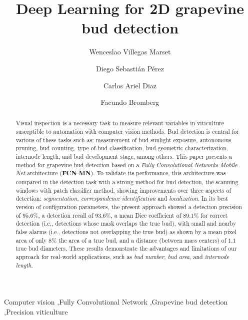 \documentclass[a4paper,authoryear,review]{elsarticle}
\begin{document}
	
	\begin{frontmatter}
		
		\title{Deep Learning for 2D grapevine bud detection}
		
		\author[utn]{Wenceslao Villegas Marset}
		
		\author[utn,conicet]{Diego Sebastián Pérez}
		
		\author[utn]{Carlos Ariel Diaz}
		
		\author[utn,conicet]{Facundo Bromberg}
		
		\address[utn]{Universidad Tecnológica Nacional.  Dpto. de Sistemas de la Información.  Grupo de Inteligencia Artificial DHARMa, Mendoza, Argentina.}
		
		\address[conicet]{Consejo Nacional de Investigaciones Científicas y Técnicas (CONICET), Argentina.}
		
		
		\begin{abstract}
			Visual inspection is a necessary task to measure relevant variables in viticulture susceptible to automation with computer vision methods. Bud detection is central for various of these tasks such as: measurement of bud sunlight exposure, autonomous pruning, bud counting, type-of-bud classification, bud geometric characterization, internode length, and bud development stage, among others. This paper presents a method for grapevine bud detection based on a \emph{Fully Convolutional Networks Mobile-Net} architecture (\textbf{FCN-MN}). To validate its performance, this architecture was compared in the detection task with a strong  method for bud detection, the scanning windows with patch classifier method, showing improvements over three aspects of detection: \emph{segmentation, correspondence identification} and \emph{localization}. In its best version of configuration parameters, the present approach showed a detection precision of $95.6\%$, a detection recall of $93.6\%$, a mean Dice coefficient of $89.1\%$ for correct detection (i.e., detections whose mask overlaps the true bud), with small and nearby false alarms (i.e., detections not overlapping the true bud) as shown by a mean pixel area of only $8\%$ the area of a true bud,  and a distance (between mass centers) of $1.1$ true bud diameters. These results demonstrate the advantages and limitations of our approach for real-world applications, such as \emph{bud number}, \emph{bud area}, and \emph{internode length}.
		\end{abstract}
		
		\begin{keyword}
			Computer vision \sep Fully Convolutional Network \sep Grapevine bud detection \sep Precision viticulture
		\end{keyword}
	\end{frontmatter}
	
\end{document}
